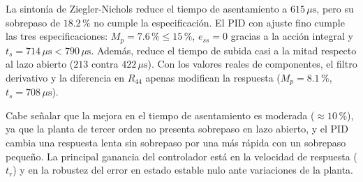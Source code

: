 \documentclass[pdflatex,sn-mathphys-num]{sn-jnl}%
\begin{document}
La sintonía de Ziegler-Nichols reduce el tiempo de asentamiento a $615\,\mu\text{s}$, pero su sobrepaso de $18.2\,\%$ no cumple la especificación. El PID con ajuste fino cumple las tres especificaciones: $M_p=7.6\,\%\leq15\,\%$, $e_{ss}=0$ gracias a la acción integral y $t_s=714\,\mu\text{s}<790\,\mu\text{s}$. Además, reduce el tiempo de subida casi a la mitad respecto al lazo abierto ($213$ contra $422\,\mu\text{s}$). Con los valores reales de componentes, el filtro derivativo y la diferencia en $R_{44}$ apenas modifican la respuesta ($M_p=8.1\,\%$, $t_s=708\,\mu\text{s}$).

Cabe señalar que la mejora en el tiempo de asentamiento es moderada ($\approx10\,\%$), ya que la planta de tercer orden no presenta sobrepaso en lazo abierto, y el PID cambia una respuesta lenta sin sobrepaso por una más rápida con un sobrepaso pequeño. La principal ganancia del controlador está en la velocidad de respuesta ($t_r$) y en la robustez del error en estado estable nulo ante variaciones de la planta.

\end{document}
